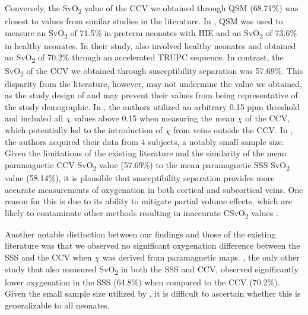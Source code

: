 \documentclass[
true
]{sn-jnl}
\begin{document}
Conversely, the SvO\textsubscript{2} value of the CCV we obtained
through QSM (68.71\%) was closest to values from similar studies in the
literature. In \citet{weberQuantitativeSusceptibilityMapping2021}, QSM
was used to measure an SvO\textsubscript{2} of 71.5\% in preterm
neonates with HIE and an SvO\textsubscript{2} of 73.6\% in healthy
neonates. In their study,
\citet{jiangVesselspecificQuantificationNeonatal2019} also involved
healthy neonates and obtained an SvO\textsubscript{2} of 70.2\% through
an accelerated TRUPC sequence. In contrast, the SvO\textsubscript{2} of
the CCV we obtained through susceptibility separation was 57.69\%. This
disparity from the literature, however, may not undermine the value we
obtained, as the study design of
\citet{weberQuantitativeSusceptibilityMapping2021} and
\citet{jiangVesselspecificQuantificationNeonatal2019} may prevent their
values from being representative of the study demographic. In
\citet{weberQuantitativeSusceptibilityMapping2021}, the authors utilized
an arbitrary 0.15 ppm threshold and included all \(\chi\) values above
0.15 when measuring the mean \(\chi\) of the CCV, which potentially led
to the introduction of \(\chi\) from veins outside the CCV. In
\citet{jiangVesselspecificQuantificationNeonatal2019}, the authors
acquired their data from 4 subjects, a notably small sample size. Given
the limitations of the existing literature and the similarity of the
mean paramagnetic CCV SvO\textsubscript{2} value (57.69\%) to the mean
paramagnetic SSS SvO\textsubscript{2} value (58.14\%), it is plausible
that susceptibility separation provides more accurate measurements of
oxygenation in both cortical and subcortical veins. One reason for this
is due to its ability to mitigate partial volume effects, which are
likely to contaminate other methods resulting in inaccurate
CSvO\textsubscript{2} values
\citep{shinHseparationMagneticSusceptibility2021}.

Another notable distinction between our findings and those of the
existing literature was that we observed no significant oxygenation
difference between the SSS and the CCV when \(\chi\) was derived from
paramagnetic maps.
\citet{jiangVesselspecificQuantificationNeonatal2019}, the only other
study that also measured SvO\textsubscript{2} in both the SSS and CCV,
observed significantly lower oxygenation in the SSS (64.8\%) when
compared to the CCV (70.2\%). Given the small sample size utilized by
\citet{jiangVesselspecificQuantificationNeonatal2019}, it is difficult
to ascertain whether this is generalizable to all neonates.
\end{document}
